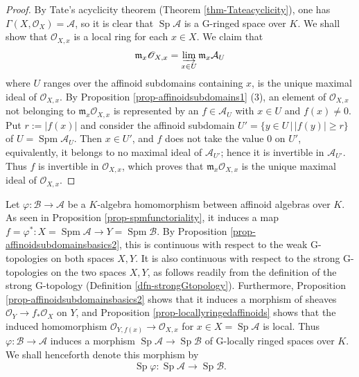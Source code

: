 \documentclass[a4paper,12pt, dvipdfmx]{jsbook}
\def\O{\mathscr{O}}
\def\m{\mathfrak{m}}
\def\Spm{\mathop{\mathrm{Spm}}\nolimits}
\def\Sp{\mathop{\mathrm{Sp}}\nolimits}
\newcommand{\abs}[1]{\lvert#1\rvert}
\theoremstyle{plain}
\theoremstyle{definition}
\begin{document}
\begin{proof}[Proof]
By Tate's acyclicity theorem (Theorem \ref{thm-Tateacyclicity}), one has $\Gamma(X,\O_X)=\mathcal{A}$, so it is clear that $\Sp\mathcal{A}$ is a G-ringed space over $K$.
We shall show that $\O_{X,x}$ is a local ring for each $x\in X$.
We claim that
$$
\m_x\O_{X,x}=\varinjlim_{x\in U}\m_x\mathcal{A}_U
$$
where $U$ ranges over the affinoid subdomains containing $x$, is the unique maximal ideal of $\O_{X,x}$.
By Proposition \ref{prop-affinoidsubdomains1} (3), an element of $\O_{X,x}$ not belonging to $\m_x\O_{X,x}$ is represented by an $f\in\mathcal{A}_U$ with $x\in U$ and $f(x)\neq 0$.
Put $r:=\abs{f(x)}$ and consider the affinoid subdomain $U'=\{y\in U\,|\,\abs{f(y)}\geq r\}$ of $U=\Spm\mathcal{A}_U$.
Then $x\in U'$, and $f$ does not take the value $0$ on $U'$, equivalently, it belongs to no maximal ideal of $\mathcal{A}_{U'}$; hence it is invertible in $\mathcal{A}_{U'}$.
Thus $f$ is invertible in $\O_{X,x}$, which proves that $\m_x\O_{X,x}$ is the unique maximal ideal of $\O_{X,x}$.
\end{proof}

Let $\varphi\colon\mathcal{B}\rightarrow\mathcal{A}$ be a $K$-algebra homomorphism between affinoid algebras over $K$.
As seen in Proposition \ref{prop-spmfunctoriality}, it induces a map $f=\varphi^{\ast}\colon X=\Spm\mathcal{A}\rightarrow Y=\Spm\mathcal{B}$.
By Proposition \ref{prop-affinoidsubdomainsbasics2}, this is continuous with respect to the weak G-topologies on both spaces $X,Y$.
It is also continuous with respect to the strong G-topologies on the two spaces $X,Y$, as follows readily from the definition of the strong G-topology (Definition \ref{dfn-strongGtopology}).
Furthermore, Proposition \ref{prop-affinoidsubdomainsbasics2} shows that it induces a morphism of sheaves $\O_Y\rightarrow f_{\ast}\O_X$ on $Y$, and Proposition \ref{prop-locallyringedaffinoids} shows that the induced homomorphism $\O_{Y,f(x)}\rightarrow\O_{X,x}$ for $x\in X=\Sp\mathcal{A}$ is local.
Thus $\varphi\colon\mathcal{B}\rightarrow\mathcal{A}$ induces a morphism $\Sp\mathcal{A}\rightarrow\Sp\mathcal{B}$ of G-locally ringed spaces over $K$.
We shall henceforth denote this morphism by
$$
\Sp\varphi\colon\Sp\mathcal{A}\longrightarrow\Sp\mathcal{B}.
$$
\end{document}
